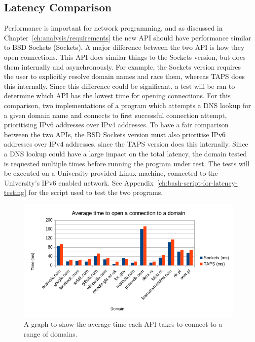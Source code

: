 \subsection{Latency Comparison}\label{subsec:latency-comparison}
Performance is important for network programming, and as discussed in Chapter~\ref{ch:analysis/requirements} the new
API should have performance similar to BSD Sockets (Sockets).
A major difference between the two API is how they open connections.
This API does similar things to the Sockets version, but does them internally and asynchronously.
For example, the Sockets version requires the user to explicitly resolve domain names and race them, whereas TAPS
does this internally.
Since this difference could be significant, a test will be ran to determine which API has the lowest time for opening
connections.
For this comparison, two implementations of a program which attempts a DNS lookup for a given domain name and connects
to first successful connection attempt, prioritising IPv6 addresses over IPv4 addresses.
To have a fair comparison between the two APIs, the BSD Sockets version must also prioritise IPv6 addresses over IPv4
addresses, since the TAPS version does this internally.
Since a DNS lookup could have a large impact on the total latency, the domain tested is requested multiple times before
running the program under test.
The tests will be executed on a University-provided Linux machine, connected to the University's IPv6 enabled network.
See Appendix~\ref{ch:bash-script-for-latency-testing} for the script used to test the two programs.

\begin{figure}[h]
    \includegraphics[width=\textwidth]{../data/processed/avg_latency}
    \caption{A graph to show the average time each API takes to connect to a range of domains.}
    \label{fig:latency}
\end{figure}

